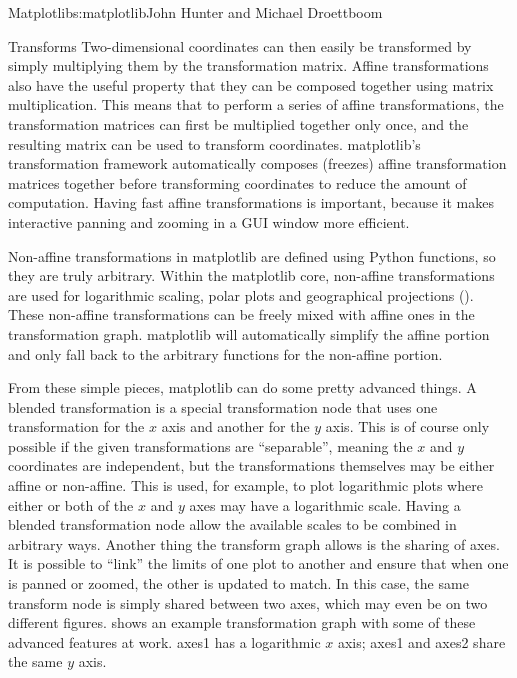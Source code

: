 \begin{aosachapter}{Matplotlib}{s:matplotlib}{John Hunter and Michael Droettboom}
\begin{aosasect1}{Transforms}
Two-dimensional coordinates can then easily be transformed by simply
multiplying them by the transformation matrix.  Affine transformations
also have the useful property that they can be composed together using
matrix multiplication.  This means that to perform a series of affine
transformations, the transformation matrices can first be multiplied
together only once, and the resulting matrix can be used to transform
coordinates.  matplotlib's transformation framework automatically
composes (freezes) affine transformation matrices together before
transforming coordinates to reduce the amount of computation.  Having
fast affine transformations is important, because it makes interactive
panning and zooming in a GUI window more efficient.


Non-affine transformations in matplotlib are defined using Python
functions, so they are truly arbitrary.  Within the matplotlib core,
non-affine transformations are used for logarithmic scaling, polar
plots and geographical projections ().
These non-affine transformations can be freely mixed with affine ones
in the transformation graph.  matplotlib will automatically simplify
the affine portion and only fall back to the arbitrary functions for
the non-affine portion.

From these simple pieces, matplotlib can do some pretty advanced
things.  A blended transformation is a special transformation node
that uses one transformation for the $x$ axis and another for the $y$
axis.  This is of course only possible if the given transformations
are ``separable'', meaning the $x$ and $y$ coordinates are
independent, but the transformations themselves may be either affine
or non-affine.  This is used, for example, to plot logarithmic plots
where either or both of the $x$ and $y$ axes may have a logarithmic
scale.  Having a blended transformation node allow the available
scales to be combined in arbitrary ways.  Another thing the transform
graph allows is the sharing of axes.  It is possible to ``link'' the
limits of one plot to another and ensure that when one is panned or
zoomed, the other is updated to match.  In this case, the same
transform node is simply shared between two axes, which may even be on
two different figures.  
shows an example transformation graph with some of these advanced
features at work.  axes1 has a logarithmic $x$ axis;  axes1 and axes2
share the same $y$ axis.


\end{aosasect1}
\end{aosachapter}
